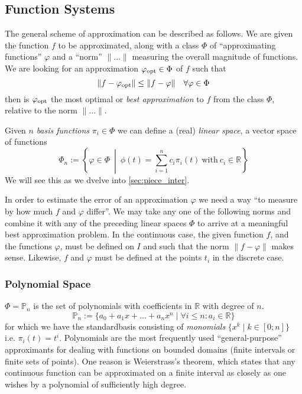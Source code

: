 \subsection{Function Systems}
The general scheme of approximation can be described as follows.
We are given the function \(f\) to be approximated, along with a class \(\Phi\) of ``approximating functions'' \(\varphi\) and a ``norm'' \(\|\ldots\|\) measuring the overall magnitude of functions.
We are looking for an approximation \(\varphi_{\operatorname{opt}} \in \Phi\) of \(f\) such that
\[\|f - \varphi_{\operatorname{opt}} \| \leq \|f - \varphi\| \quad \forall \varphi \in \Phi\]
then is \(\varphi_{\operatorname{opt}}\) the most optimal or \emph{best approximation} to \(f\) from the class \(\Phi\), relative to the norm \(\|\ldots\|\).

Given \(n\) \emph{basis functions} \(\pi_i \in \Phi\) we can define a (real) \emph{linear space}, a vector space of functions
\[\Phi_n := \left\{\varphi \in \Phi ~\middle|~ \phi(t) = \sum_{i=1}^n c_i \pi_i(t)~\text{with}~c_i \in \mathbb{R}\right\}\]
We will see this as we dvelve into \cref{sec:piece_inter}.

In order to estimate the error of an approximation \(\varphi\) we need a way ``to measure by how much \(f\) and \(\varphi\) differ''.
We may take any one of the following norms and combine it with any of the preceding linear spaces \(\Phi\) to arrive at a meaningful best approximation problem.
In the continuous case, the given function \(f\), and the functions \(\varphi\), must be defined on \(I\) and such that the norm \(\|f - \varphi\|\) makes sense.
Likewise, \(f\) and \(\varphi\) must be defined at the points \(t_i\) in the discrete case.

\subsubsection{Polynomial Space}
\(\Phi = \mathbb{P}_n\) is the set of polynomials with coefficients in \(\mathbb{R}\) with degree of \(n\).
\[\mathbb{P}_n := \{a_0 + a_1 x + \ldots + a_n x^n \mid \forall i \leq n: a_i \in \mathbb{R}\}\]
for which we have the standardbasis consisting of \emph{monomials} \(\{x^k \mid k \in [0; n]\}\) i.e. \(\pi_i(t) = t^i\).
Polynomials are the most frequently used ``general-purpose'' approximants for dealing with functions on bounded domains (finite intervals or finite sets of points).
One reason is Weierstrass’s theorem, which states that any continuous function can be approximated on a finite interval as closely as one wishes by a polynomial of sufficiently high degree.

